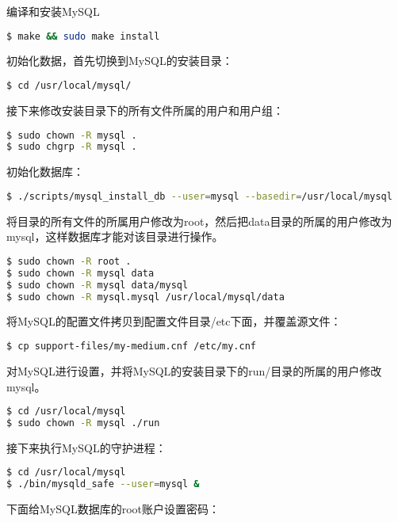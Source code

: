 编译和安装MySQL


\begin{lstlisting}[language=bash]
$ make && sudo make install
\end{lstlisting}

初始化数据，首先切换到MySQL的安装目录：


\begin{lstlisting}[language=bash]
$ cd /usr/local/mysql/
\end{lstlisting}


接下来修改安装目录下的所有文件所属的用户和用户组：

\begin{lstlisting}[language=bash]
$ sudo chown -R mysql .
$ sudo chgrp -R mysql .
\end{lstlisting}

初始化数据库：


\begin{lstlisting}[language=bash]
$ ./scripts/mysql_install_db --user=mysql --basedir=/usr/local/mysql
\end{lstlisting}

将目录的所有文件的所属用户修改为root，然后把data目录的所属的用户修改为mysql，这样数据库才能对该目录进行操作。


\begin{lstlisting}[language=bash]
$ sudo chown -R root .
$ sudo chown -R mysql data
$ sudo chown -R mysql data/mysql
$ sudo chown -R mysql.mysql /usr/local/mysql/data
\end{lstlisting}

将MySQL的配置文件拷贝到配置文件目录/etc下面，并覆盖源文件：


\begin{lstlisting}[language=bash]
$ cp support-files/my-medium.cnf /etc/my.cnf
\end{lstlisting}

对MySQL进行设置，并将MySQL的安装目录下的run/目录的所属的用户修改mysql。


\begin{lstlisting}[language=bash]
$ cd /usr/local/mysql
$ sudo chown -R mysql ./run
\end{lstlisting}

接下来执行MySQL的守护进程：


\begin{lstlisting}[language=bash]
$ cd /usr/local/mysql
$ ./bin/mysqld_safe --user=mysql &
\end{lstlisting}

下面给MySQL数据库的root账户设置密码：

